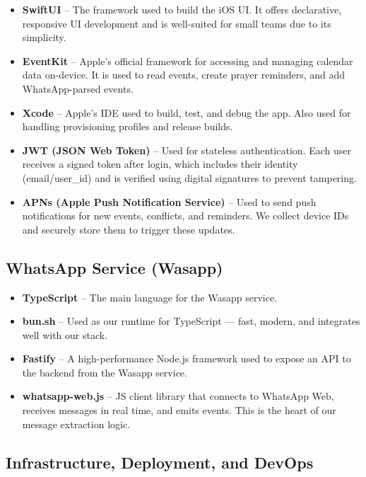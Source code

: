 \begin{itemize}
    \item \textbf{SwiftUI} – The framework used to build the iOS UI. It offers declarative, responsive UI development and is well-suited for small teams due to its simplicity.
    \item \textbf{EventKit} – Apple's official framework for accessing and managing calendar data on-device. It is used to read events, create prayer reminders, and add WhatsApp-parsed events.
    \item \textbf{Xcode} – Apple's IDE used to build, test, and debug the app. Also used for handling provisioning profiles and release builds.
    \item \textbf{JWT (JSON Web Token)} – Used for stateless authentication. Each user receives a signed token after login, which includes their identity (email/user\_id) and is verified using digital signatures to prevent tampering.
    \item \textbf{APNs (Apple Push Notification Service)} – Used to send push notifications for new events, conflicts, and reminders. We collect device IDs and securely store them to trigger these updates.
\end{itemize}

\subsection{WhatsApp Service (Wasapp)}

\begin{itemize}
    \item \textbf{TypeScript} – The main language for the Wasapp service.
    \item \textbf{bun.sh} – Used as our runtime for TypeScript — fast, modern, and integrates well with our stack.
    \item \textbf{Fastify} – A high-performance Node.js framework used to expose an API to the backend from the Wasapp service.
    \item \textbf{whatsapp-web.js} – JS client library that connects to WhatsApp Web, receives messages in real time, and emits events. This is the heart of our message extraction logic.
\end{itemize}

\subsection{Infrastructure, Deployment, and DevOps}


